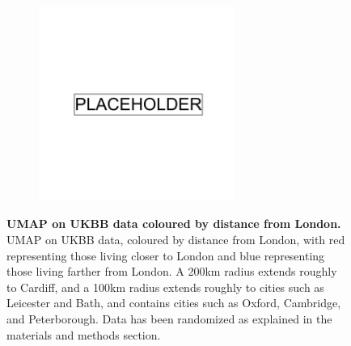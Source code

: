 \begin{figure}
    \centering
    \begin{subfigure}{0.9\textwidth}
    \includegraphics[width=0.7\textwidth]{placeholder.png}
    \end{subfigure}
    \caption[UMAP on UKBB data coloured by distance from London]{\textbf{UMAP on UKBB data coloured by distance from London.} UMAP on UKBB data, coloured by distance from London, with red representing those living closer to London and blue representing those living farther from London. A 200km radius extends roughly to Cardiff, and a 100km radius extends roughly to cities such as Leicester and Bath, and contains cities such as Oxford, Cambridge, and Peterborough. Data has been randomized as explained in the materials and methods section.}
    \label{fig:supp_london_distance}
\end{figure}

\newpage

